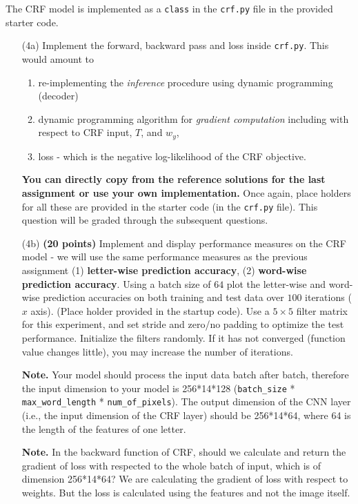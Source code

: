 \documentclass[11pt]{report}
\begin{document}
The CRF model is implemented as a \texttt{class} in the \texttt{crf.py} file in
the provided starter code.
%
\begin{itemize}
\item[(4a)] Implement the forward, backward pass and loss inside
  \texttt{crf.py}. This would amount to 
  \begin{enumerate}
  	\item re-implementing the \emph{inference} procedure using dynamic programming (decoder) 
  	\item dynamic programming algorithm for \emph{gradient computation} including with respect to CRF input, $T$, and $w_y$,
  	\item loss - which is the negative log-likelihood of the CRF objective. 
  \end{enumerate} 
	\textbf{You can directly copy from the reference solutions for the last assignment or use your own implementation.}
  Once again, place holders for
  all these are provided in the starter code (in the \texttt{crf.py} file). This
  question will be graded through the subsequent questions.

\item[(4b)] \textbf{(20 points)} Implement and display performance measures on
  the CRF model - we will use the same performance measures as the previous
  assignment (1) \textbf{letter-wise prediction accuracy}, (2) \textbf{word-wise
    prediction accuracy}. Using a batch size of \(64\) plot the letter-wise and
  word-wise prediction accuracies on both training and test data over \(100\)
  iterations (\(x\) axis). (Place holder provided in the startup code). Use a
  \(5 \times 5\) filter matrix for this experiment, and set stride and zero/no
  padding to optimize the test performance.
  Initialize the filters randomly.
  If it has not converged (function value changes little), you may increase the number of iterations.

{\bf Note.} Your model should process the input data batch after batch, therefore the input dimension to your model is 256*14*128 (\verb#batch_size# * \verb#max_word_length# * \verb#num_of_pixels#). The output dimension of the CNN layer (i.e., the input dimension of the CRF layer) should be 256*14*64, where 64 is the length of the features of one letter.

{\bf Note.} In the backward function of CRF, should we calculate and return the gradient of loss with respected to the whole batch of input, which is of dimension 256*14*64? We are calculating the gradient of loss with respect to weights.  But the loss is calculated using the features and not the image itself.


\end{itemize}
\end{document}
